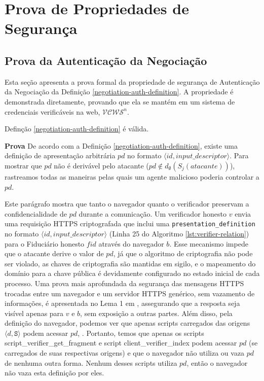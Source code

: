 \section{Prova de Propriedades de Segurança}

\subsection*{Prova da Autenticação da Negociação}
Esta seção apresenta a prova formal da propriedade de segurança de Autenticação da Negociação da Definição \ref{negotiation-auth-definition}. A propriedade é demonstrada diretamente, provando que ela se mantém em um sistema de credenciais verificáveis na web, $\mathcal{VCWS}^n$.

\begin{lema}
Definção \ref{negotiation-auth-definition} é válida.
\end{lema}

\textbf{Prova} De acordo com a Definição \ref{negotiation-auth-definition}, existe uma definição de apresentação arbitrária $pd$ no formato $\langle id, input\_descriptor \rangle$. Para mostrar que $pd$ não é derivável pelo atacante ($pd \not \in d_{\emptyset}(S_j(atacante))$), rastreamos todas as maneiras pelas quais um agente malicioso poderia controlar a $pd$.

Este parágrafo mostra que tanto o navegador quanto o verificador preservam a confidencialidade de $pd$ durante a comunicação. Um verificador honesto $v$ envia uma requisição HTTPS criptografada que inclui
  uma \texttt{presentation\_definition} no formato $ \langle id, input\_descriptor\rangle $ (Linha 25 do Algoritmo \ref{lst:verifier-relation}) para o Fiduciário honesto $fid$ através do navegador $b$. 
  Esse mecanismo impede que o atacante derive o valor de $pd$, já que o algoritmo de criptografia não pode ser violado, as chaves de criptografia são mantidas em sigilo, e o mapeamento do domínio para a chave pública é devidamente configurado no estado inicial de cada processo. 
  Uma prova mais aprofundada da segurança das mensagens HTTPS trocadas entre um navegador e um servidor HTTPS genérico, sem vazamento de informações, é apresentada no Lema 1 em \cite{fett2024wim}, assegurando que a resposta seja visível apenas para $v$ e $b$, sem exposição a outras partes.
  Além disso, pela definição do navegador, podemos ver que apenas scripts carregados das origens $\langle d, \texttt{S} \rangle$ podem acessar $pd$, \cite[Seção 2.10]{fett2024wim}. 
  Portanto, temos que apenas os scripts script\_verifier\_get\_fragment e script client\_verifier\_index podem acessar $pd$ (se carregados de suas respectivas origens) e que o navegador não utiliza ou vaza $pd$ de nenhuma outra forma.
  Nenhum desses scripts utiliza $pd$, então o navegador não vaza esta definição por eles.
  
